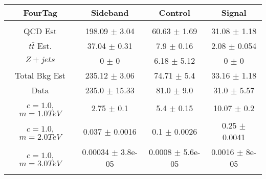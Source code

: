 \begin{footnotesize} 
\begin{tabular}{c|c|c|c} 
FourTag & Sideband & Control & Signal \\ 
\hline\hline 
& & & \\ 
QCD Est & 198.09 $\pm$ 3.04 & 60.63 $\pm$ 1.69 & 31.08 $\pm$ 1.18\\ 
$t\bar{t}$ Est.  & 37.04 $\pm$ 0.31 & 7.9 $\pm$ 0.16 & 2.08 $\pm$ 0.054\\ 
$Z+jets$ & 0 $\pm$ 0 & 6.18 $\pm$ 5.12 & 0 $\pm$ 0\\ 
Total Bkg Est & 235.12 $\pm$ 3.06 & 74.71 $\pm$ 5.4 & 33.16 $\pm$ 1.18\\ 
Data & 235.0 $\pm$ 15.33 & 81.0 $\pm$ 9.0 & 31.0 $\pm$ 5.57\\ 
$c=1.0$,$m=1.0TeV$ & 2.75 $\pm$ 0.1 & 5.4 $\pm$ 0.15 & 10.07 $\pm$ 0.2\\ 
$c=1.0$,$m=2.0TeV$ & 0.037 $\pm$ 0.0016 & 0.1 $\pm$ 0.0026 & 0.25 $\pm$ 0.0041\\ 
$c=1.0$,$m=3.0TeV$ & 0.00034 $\pm$ 3.8e-05 & 0.0008 $\pm$ 5.6e-05 & 0.0016 $\pm$ 8e-05\\ 
& & & \\ 
\hline\hline 
\end{tabular} 
\end{footnotesize} 
\newline 
